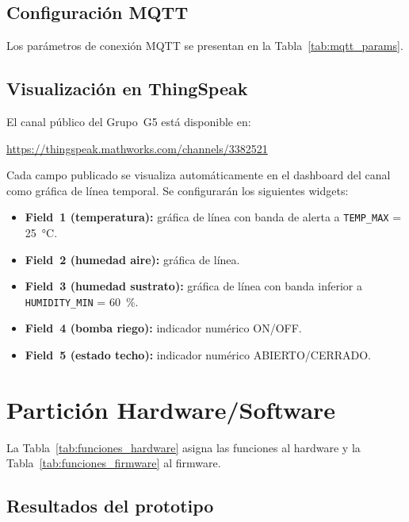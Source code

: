 

\subsection{Configuración MQTT}

Los parámetros de conexión MQTT se presentan en la Tabla~\ref{tab:mqtt_params}.



\subsection{Visualización en ThingSpeak}

El canal público del Grupo~G5 está disponible en:
\begin{center}
\url{https://thingspeak.mathworks.com/channels/3382521}
\end{center}

Cada campo publicado se visualiza automáticamente en el dashboard del canal como gráfica de línea temporal. Se configurarán los siguientes widgets:

\begin{itemize}
    \item \textbf{Field~1 (temperatura):} gráfica de línea con banda de alerta a \texttt{TEMP\_MAX} = 25~°C.
    \item \textbf{Field~2 (humedad aire):} gráfica de línea.
    \item \textbf{Field~3 (humedad sustrato):} gráfica de línea con banda inferior a \texttt{HUMIDITY\_MIN} = 60~\%.
    \item \textbf{Field~4 (bomba riego):} indicador numérico ON/OFF.
    \item \textbf{Field~5 (estado techo):} indicador numérico ABIERTO/CERRADO.
\end{itemize}

\section{Partición Hardware/Software}

La Tabla~\ref{tab:funciones_hardware} asigna las funciones al hardware y la Tabla~\ref{tab:funciones_firmware} al firmware.




\subsection{Resultados del prototipo}

